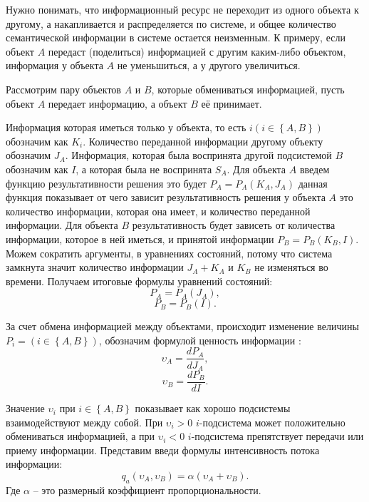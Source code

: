 Нужно понимать, что информационный ресурс не переходит из одного объекта к другому, а накапливается и распределяется по системе, и общее количество семантической информации в системе остается неизменным. К примеру, если объект $A$ передаст (поделиться) информацией с другим каким-либо объектом, информация у объекта $A$ не уменьшиться, а у другого увеличиться.

Рассмотрим пару объектов $A$ и $B$, которые обмениваться информацией, пусть объект $A$ передает информацию, а объект $B$ её принимает.

Информация которая иметься только у объекта, то есть  $i \left( i \in \left\{A,B \right\} \right)$ обозначим как $K_i$. Количество переданной информации другому объекту обозначим $J_A$. Информация, которая была воспринята другой подсистемой $B$ обозначим как $I$, а которая была не воспринята $S_A$. Для объекта $A$ введем функцию результативности решения это будет $P_A=P_A(K_A,J_A)$ данная функция показывает от чего зависит результативность решения у объекта $A$ 	это количество информации, которая она имеет, и количество переданной информации. Для объекта $B$ результативность будет зависеть от количества информации, которое в ней иметься, и принятой информации $P_B=P_B(K_B,I)$. 
Можем сократить аргументы, в уравнениях состояний, потому что система замкнута значит количество информации $J_A+K_A$ и $K_B$ не изменяться во времени. Получаем итоговые формулы уравнений состояний:
\begin{equation}\label{eq:sost1}
P_A=P_A(J_A),
\end{equation}
\begin{equation}\label{eq:sost2}
P_B=P_B(I). 
\end{equation}

За счет обмена информацией между объектами, происходит изменение величины $P_i = \left( i \in \left\{A,B \right\} \right)$, обозначим формулой ценность информации :
\begin{equation}\label{eq:cenoostinfo1}
\upsilon_A = \frac{dP_A}{dJ_A},
\end{equation}
\begin{equation}\label{eq:cenoostinfo2}
\upsilon_B = \frac{dP_B	}{dI}.
\end{equation}

Значение $\upsilon_i$ при $i \in \left\{A,B \right\}$ показывает как хорошо подсистемы взаимодействуют между собой. При $\upsilon_i > 0$ $i$-подсистема может положительно обмениваться информацией, а при $\upsilon_i < 0$ $i$-подсистема препятствует передачи или приему информации. Представим введи формулы интенсивность потока информации:
\begin{equation}\label{eq:intensive}
q_a(\upsilon_A,\upsilon_B) = \alpha (\upsilon_A + \upsilon_B).
\end{equation}
Где $\alpha$ -- это размерный коэффициент пропорциональности.

